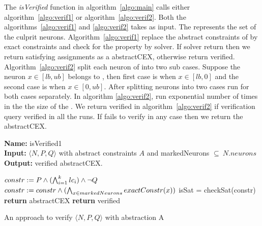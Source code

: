 The \emph{isVerified} function in algorithm~\ref{algo:main} calls either algorithm~\ref{algo:verif1} or algorithm~\ref{algo:verif2}. 
Both the algorithms~\ref{algo:verif1} and \ref{algo:verif2} takes \markednewrons{} as input. 
The \markednewrons{} represents the set of the culprit neurons. 
Algorithm~\ref{algo:verif1} replace the abstract constraints of \markednewrons{} by exact constraints and check for the 
property by \milp{} solver. If \milp{} solver return \sat{} then we return satisfying assignments as a abstractCEX, 
otherwise return verified. Algorithm~\ref{algo:verif2} split each neuron of \markednewrons{} into two sub cases. Suppose the 
neuron $x\in [lb,ub]$ belongs to \markednewrons{}, then first case is when $x \in [lb,0]$ and the second case is when $x \in [0,ub]$.   
After splitting neurons into two cases \deeppoly{} run for both cases separately. In algorithm \ref{algo:verif2}, \deeppoly{}
run exponential number of times in the the size of the \markednewrons{}. We return verified in algorithm~\ref{algo:verif2} if 
verification query verified in all the \deeppoly{} runs. If \deeppoly{} fails to verify in any case then we return the abstractCEX. 


\begin{algorithm}[t]
  \textbf{Name: } isVerified1 \\
  \textbf{Input: } $\langle N,P,Q \rangle$ with abstract constraints $A$ and markedNeurons $\subseteq ~ N.neurons$ \\
  \textbf{Output: } verified abstractCEX. 
  \begin{algorithmic}[1]
    \State $constr := P \land (\bigwedge_{i=1}^k lc_i)\land \neg Q$
    \State $constr := constr \land (\bigwedge_{x \in markedNeurons} exactConstr(x))$ 
    \State isSat = checkSat(constr)
      \State \textbf{return} abstractCEX
    \Else
      \State \textbf{return} verified
    \EndIf
  \end{algorithmic}
  \caption{An approach to verify $\langle N,P,Q \rangle$ with abstraction A}
  \label{algo:verif1}
\end{algorithm}

